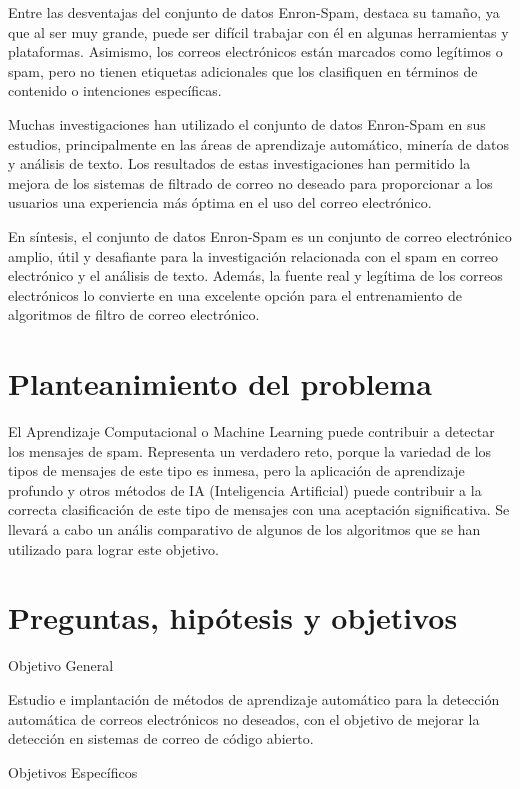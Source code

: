 Entre las desventajas del conjunto de datos Enron-Spam, destaca su tamaño, ya que al ser muy grande, puede ser difícil trabajar con él en algunas herramientas y plataformas. Asimismo, los correos electrónicos están marcados como legítimos o spam, pero no tienen etiquetas adicionales que los clasifiquen en términos de contenido o intenciones específicas.

Muchas investigaciones han utilizado el conjunto de datos Enron-Spam en sus estudios, principalmente en las áreas de aprendizaje automático, minería de datos y análisis de texto. Los resultados de estas investigaciones han permitido la mejora de los sistemas de filtrado de correo no deseado para proporcionar a los usuarios una experiencia más óptima en el uso del correo electrónico.

En síntesis, el conjunto de datos Enron-Spam es un conjunto de correo electrónico amplio, útil y desafiante para la investigación relacionada con el spam en correo electrónico y el análisis de texto. Además, la fuente real y legítima de los correos electrónicos lo convierte en una excelente opción para el entrenamiento de algoritmos de filtro de correo electrónico.	
\section{Planteanimiento del problema}
El Aprendizaje Computacional o Machine Learning puede contribuir a detectar los mensajes de spam. Representa un verdadero reto, porque la variedad de los tipos de mensajes de este tipo es inmesa, pero la aplicación de aprendizaje profundo y otros métodos de IA (Inteligencia Artificial) puede contribuir a la correcta clasificación de este tipo de mensajes con una aceptación significativa. Se llevará a cabo un anális comparativo de  algunos de los algoritmos que se han utilizado para lograr este objetivo.
\section{Preguntas, hipótesis y objetivos}
Objetivo General

Estudio e implantación de métodos de aprendizaje automático para la detección automática de correos electrónicos no deseados, con el objetivo de mejorar la detección en sistemas de correo de código abierto.

Objetivos Específicos


